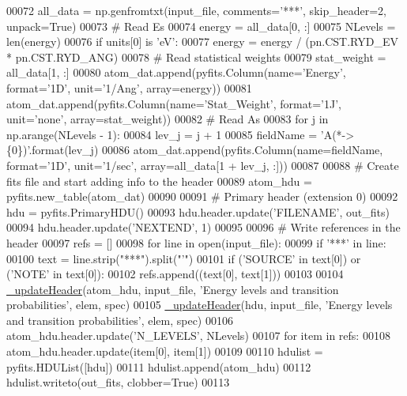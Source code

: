 \begin{DoxyCode}
00072     all\_data = np.genfromtxt(input\_file, comments=\textcolor{stringliteral}{'***'}, skip\_header=2, unpack=\textcolor{keyword}{True})
00073     \textcolor{comment}{# Read Es}
00074     energy = all\_data[0, :]
00075     NLevels = len(energy)
00076     \textcolor{keywordflow}{if} units[0] \textcolor{keywordflow}{is} \textcolor{stringliteral}{'eV'}: 
00077         energy = energy / (pn.CST.RYD\_EV * pn.CST.RYD\_ANG)
00078     \textcolor{comment}{# Read statistical weights}
00079     stat\_weight = all\_data[1, :]
00080     atom\_dat.append(pyfits.Column(name=\textcolor{stringliteral}{'Energy'}, format=\textcolor{stringliteral}{'1D'}, unit=\textcolor{stringliteral}{'1/Ang'}, array=energy))
00081     atom\_dat.append(pyfits.Column(name=\textcolor{stringliteral}{'Stat\_Weight'}, format=\textcolor{stringliteral}{'1J'}, unit=\textcolor{stringliteral}{'none'}, array=stat\_weight))    
00082     \textcolor{comment}{# Read As}
00083     \textcolor{keywordflow}{for} j \textcolor{keywordflow}{in} np.arange(NLevels - 1):
00084         lev\_j = j + 1
00085         fieldName = \textcolor{stringliteral}{'A(*->\{0\})'}.format(lev\_j)
00086         atom\_dat.append(pyfits.Column(name=fieldName, format=\textcolor{stringliteral}{'1D'}, unit=\textcolor{stringliteral}{'1/sec'}, array=all\_data[1 + lev\_j, 
      :]))
00087 
00088     \textcolor{comment}{# Create fits file and start adding info to the header}
00089     atom\_hdu = pyfits.new\_table(atom\_dat)   
00090             
00091     \textcolor{comment}{# Primary header (extension 0)}
00092     hdu = pyfits.PrimaryHDU()
00093     hdu.header.update(\textcolor{stringliteral}{'FILENAME'}, out\_fits)
00094     hdu.header.update(\textcolor{stringliteral}{'NEXTEND'}, 1)
00095  
00096     \textcolor{comment}{# Write references in the header}
00097     refs = []
00098     \textcolor{keywordflow}{for} line \textcolor{keywordflow}{in} open(input\_file):
00099         \textcolor{keywordflow}{if} \textcolor{stringliteral}{'***'} \textcolor{keywordflow}{in} line:
00100             text = line.strip(\textcolor{stringliteral}{"***"}).split(\textcolor{stringliteral}{"'"})
00101             \textcolor{keywordflow}{if} (\textcolor{stringliteral}{'SOURCE'} \textcolor{keywordflow}{in} text[0]) \textcolor{keywordflow}{or} (\textcolor{stringliteral}{'NOTE'} \textcolor{keywordflow}{in} text[0]):
00102                 refs.append((text[0], text[1]))
00103 
00104     \hyperlink{namespacepyneb_1_1utils_1_1fits_a40031d2d7de219b95d7475243b3888eb}{\_updateHeader}(atom\_hdu, input\_file, \textcolor{stringliteral}{'Energy levels and transition probabilities'}, elem, 
      spec)
00105     \hyperlink{namespacepyneb_1_1utils_1_1fits_a40031d2d7de219b95d7475243b3888eb}{\_updateHeader}(hdu, input\_file, \textcolor{stringliteral}{'Energy levels and transition probabilities'}, elem, spec)
00106     atom\_hdu.header.update(\textcolor{stringliteral}{'N\_LEVELS'}, NLevels)
00107     \textcolor{keywordflow}{for} item \textcolor{keywordflow}{in} refs:
00108         atom\_hdu.header.update(item[0], item[1])
00109 
00110     hdulist = pyfits.HDUList([hdu])
00111     hdulist.append(atom\_hdu)
00112     hdulist.writeto(out\_fits, clobber=\textcolor{keyword}{True})
00113 

\end{DoxyCode}
